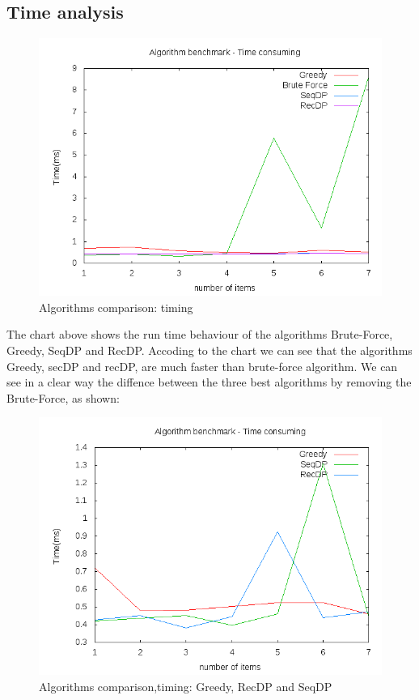 \documentclass{article}
\begin{document}
\subsection{Time analysis}

\begin{figure} [H]
\centering
\includegraphics[scale=0.5]{report/time_analysis}
\caption{Algorithms comparison: timing}
\label{report/time_analysis}
\end{figure}

The chart above shows the run time behaviour of the algorithms Brute-Force, Greedy, SeqDP and RecDP. 
Accoding to the chart we can see that the algorithms Greedy, secDP and recDP, are much faster than brute-force algorithm.
We can see in a clear way the diffence between the three best algorithms by removing the Brute-Force, as shown: 

\begin{figure} [H]
\centering
\includegraphics[scale=0.5]{report/time_analysis_no_bf}
\caption{Algorithms comparison,timing: Greedy, RecDP and SeqDP}
\label{report/time_analysis_no_bf}
\end{figure}
\end{document}
